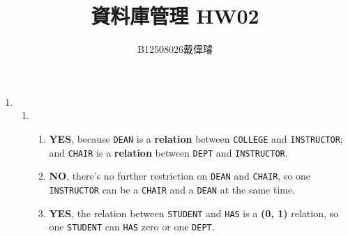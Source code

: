 \documentclass[12pt,a4paper]{article}
\title{資料庫管理 HW02}
\author{B12508026戴偉璿}
\date{}
\begin{document}
\maketitle


\begin{enumerate}
    \item
    \begin{enumerate}
        \item
        \begin{enumerate}
            \item \textbf{YES}, because \texttt{DEAN} is a \textbf{relation} between \texttt{COLLEGE} and \texttt{INSTRUCTOR}; and \texttt{CHAIR} is a \textbf{relation} between \texttt{DEPT} and \texttt{INSTRUCTOR}.
            \item \textbf{NO}, there's no further restriction on \texttt{DEAN} and \texttt{CHAIR}, so one \texttt{INSTRUCTOR} can be a \texttt{CHAIR} and a \texttt{DEAN} at the same time.
            \item \textbf{YES}, the relation between \texttt{STUDENT} and \texttt{HAS} is a \textbf{(0, 1)} relation, so one \texttt{STUDENT} can \texttt{HAS} zero or one \texttt{DEPT}.
        \end{enumerate}
    \end{enumerate}
 
\end{enumerate}
\end{document}
